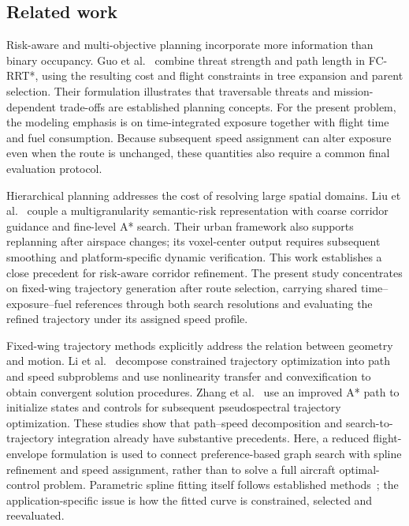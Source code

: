 \documentclass[preprint,12pt]{elsarticle}
\begin{document}
\subsection{Related work}
\label{sec:related_work}

Risk-aware and multi-objective planning incorporate more information than
binary occupancy. Guo et al.~\cite{guo2022} combine threat strength and path
length in FC-RRT*, using the resulting cost and flight constraints in tree
expansion and parent selection. Their formulation illustrates that
traversable threats and mission-dependent trade-offs are established
planning concepts. For the present problem, the modeling emphasis is on
time-integrated exposure together with flight time and fuel consumption.
Because subsequent speed assignment can alter exposure even when the route
is unchanged, these quantities also require a common final evaluation
protocol.

Hierarchical planning addresses the cost of resolving large spatial
domains. Liu et al.~\cite{liu2026} couple a multigranularity semantic-risk
representation with coarse corridor guidance and fine-level A* search.
Their urban framework also supports replanning after airspace changes; its
voxel-center output requires subsequent smoothing and platform-specific
dynamic verification. This work establishes a close precedent for
risk-aware corridor refinement. The present study concentrates on
fixed-wing trajectory generation after route selection, carrying shared
time--exposure--fuel references through both search resolutions and
evaluating the refined trajectory under its assigned speed profile.

Fixed-wing trajectory methods explicitly address the relation between
geometry and motion. Li et al.~\cite{li2025} decompose constrained trajectory
optimization into path and speed subproblems and use nonlinearity transfer
and convexification to obtain convergent solution procedures. Zhang et
al.~\cite{zhang2026} use an improved A* path to initialize states and controls
for subsequent pseudospectral trajectory optimization. These studies show
that path--speed decomposition and search-to-trajectory integration already
have substantive precedents. Here, a reduced flight-envelope formulation
is used to connect preference-based graph search with spline refinement
and speed assignment, rather than to solve a full aircraft optimal-control
problem. Parametric spline fitting itself follows established
methods~\cite{dierckx1993}; the application-specific issue is how the fitted
curve is constrained, selected and reevaluated.
\end{document}

